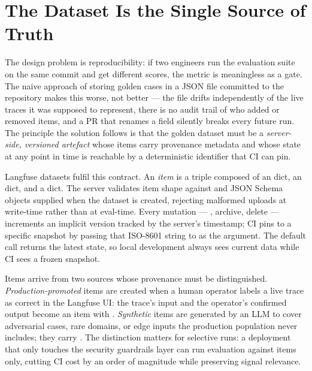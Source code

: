 \section{The Dataset Is the Single Source of Truth}
\label{sec:golden-dataset}

The design problem is reproducibility: if two engineers run the evaluation
suite on the same commit and get different scores, the metric is meaningless
as a gate.  The naive approach of storing golden cases in a JSON file
committed to the repository makes this worse, not better --- the file drifts
independently of the live traces it was supposed to represent, there is no
audit trail of who added or removed items, and a PR that renames a field
silently breaks every future run.  The principle the solution follows is
that the golden dataset must be a \emph{server-side, versioned artefact}
whose items carry provenance metadata and whose state at any point in time
is reachable by a deterministic identifier that CI can pin.

Langfuse datasets fulfil this contract.  An \emph{item} is a triple
composed of an  dict, an  dict, and a
 dict.  The server validates item shape against
 and  JSON Schema objects
supplied when the dataset is created, rejecting malformed uploads at
write-time rather than at eval-time.  Every mutation --- ,
archive, delete --- increments an implicit version tracked by the server's
 timestamp; CI pins to a specific snapshot by passing that
ISO-8601 string to  as the  argument.  The
default call returns the latest state, so local development always sees
current data while CI sees a frozen snapshot.

Items arrive from two sources whose provenance must be distinguished.
\emph{Production-promoted} items are created when a human operator labels a
live trace as correct in the Langfuse UI: the trace's input and the
operator's confirmed output become an item with
.  \emph{Synthetic} items are
generated by an LLM to cover adversarial cases, rare domains, or edge
inputs the production population never includes; they carry
.  The distinction matters for
selective runs: a deployment that only touches the security guardrails layer
can run evaluation against  items only, cutting
CI cost by an order of magnitude while preserving signal relevance.

